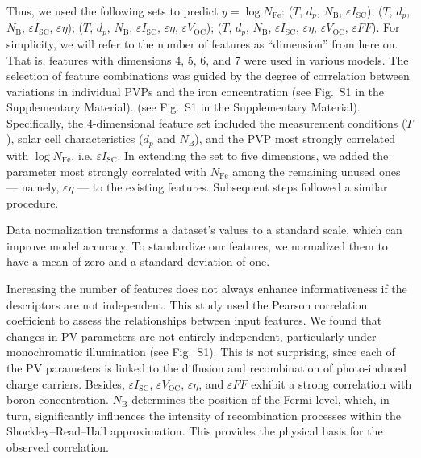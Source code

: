 \documentclass[a4paper,fleqn]{cas-sc}
\begin{document}
Thus, we used the following sets to predict $y = \log N_\mathrm{Fe}$:
($T$, $d_p$, $N_\mathrm{B}$, $\varepsilon I_\mathrm{SC}$);
($T$, $d_p$, $N_\mathrm{B}$, $\varepsilon I_\mathrm{SC}$, $\varepsilon \eta$);
($T$, $d_p$, $N_\mathrm{B}$, $\varepsilon I_\mathrm{SC}$, $\varepsilon \eta$, $\varepsilon V_\mathrm{OC}$);
($T$, $d_p$, $N_\mathrm{B}$, $\varepsilon I_\mathrm{SC}$, $\varepsilon \eta$, $\varepsilon V_\mathrm{OC}$, $\varepsilon F\!F$).
For simplicity, we will refer to the number of features as ``dimension'' from here on.
That is, features with dimensions 4, 5, 6, and 7 were used in various models.
The selection of feature combinations was guided
by the degree of correlation between variations in individual PVPs and the iron concentration (see Fig.~S1 in the Supplementary Material).
(see Fig.~S1 in the Supplementary Material).
Specifically, the 4-dimensional feature set included the measurement conditions ($T$),
solar cell characteristics ($d_p$ and $N_\mathrm{B}$), and the PVP most strongly correlated with $\log N_\mathrm{Fe}$, i.e. $\varepsilon I_\mathrm{SC}$.
In extending the set to five dimensions, we added the parameter most strongly correlated with $N_\mathrm{Fe}$
among the remaining unused ones --- namely,  $\varepsilon \eta$  --- to the existing features.
Subsequent steps followed a similar procedure.


Data normalization transforms a dataset's values to a standard scale, which can improve model accuracy.
To standardize our features, we normalized them to have a mean of zero and a standard deviation of one.

Increasing the number of features does not always enhance informativeness if the descriptors are not independent.
This study used the Pearson correlation coefficient to assess the relationships between input features.
We found that changes in PV parameters are not entirely independent, particularly under monochromatic illumination
(see Fig.~S1).
This is not surprising, since each of the PV parameters is linked to the diffusion and recombination of photo-induced charge carriers.
Besides,
$\varepsilon I_\mathrm{SC}$, $\varepsilon V_\mathrm{OC}$, $\varepsilon \eta$, and $\varepsilon F\!F$
exhibit a strong correlation with boron concentration.
$N_\mathrm{B}$ determines the position of the Fermi level, which, in turn, significantly influences
the intensity of recombination processes within the Shockley–Read–Hall approximation.
This provides the physical basis for the observed correlation.
\end{document}
